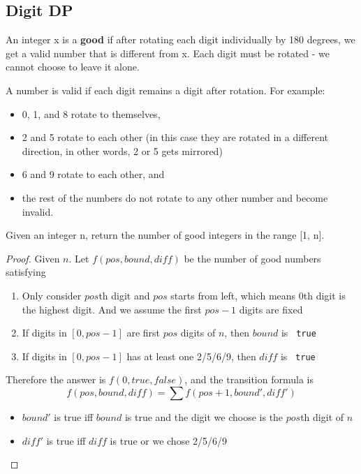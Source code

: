 \documentclass[11pt]{article}
\let\OldTexttt\texttt
\renewcommand{\texttt}[1]{\OldTexttt{\color{MidnightBlue} #1}}
\begin{document}
\subsection{Digit DP}
\label{sec:orgfe04150}
\begin{problem}
An integer x is a \textbf{good} if after rotating each digit individually by 180 degrees, we get a valid
number that is different  from x. Each digit must be rotated - we cannot choose to leave it alone.

A number is valid if each digit remains a digit after rotation. For example:
\begin{itemize}
\item 0, 1, and 8 rotate to themselves,
\item 2 and 5 rotate to each other (in this case they are rotated in a different direction, in other
words, 2 or 5 gets mirrored)
\item 6 and 9 rotate to each other, and
\item the rest of the numbers do not rotate to any other number and become invalid.
\end{itemize}

Given an integer n, return the number of good integers in the range [1, n].
\end{problem}

\begin{proof}
Given \(n\).
Let \(f(pos,bound,diff)\) be the number of good numbers satisfying
\begin{enumerate}
\item Only consider \(pos\)th digit and \(pos\) starts from left, which means 0th digit is the
highest digit. And we assume the first \(pos-1\)
digits are fixed
\item If digits in \([0,pos-1]\) are first \(pos\) digits of \(n\), then \(bound\) is \texttt{true}
\item If digits in \([0,pos-1]\) has at least one 2/5/6/9, then \(diff\) is \texttt{true}
\end{enumerate}

Therefore the answer is \(f(0, true, false)\), and the transition formula is
\begin{equation*}
f(pos,bound,diff)=\sum f(pos+1,bound',diff')
\end{equation*}
\begin{itemize}
\item \(bound'\) is true iff \(bound\) is true and the digit we choose is the \(pos\)th digit
of \(n\)
\item \(diff'\) is true iff \(diff\) is true or we chose 2/5/6/9
\end{itemize}
\end{proof}
\end{document}
